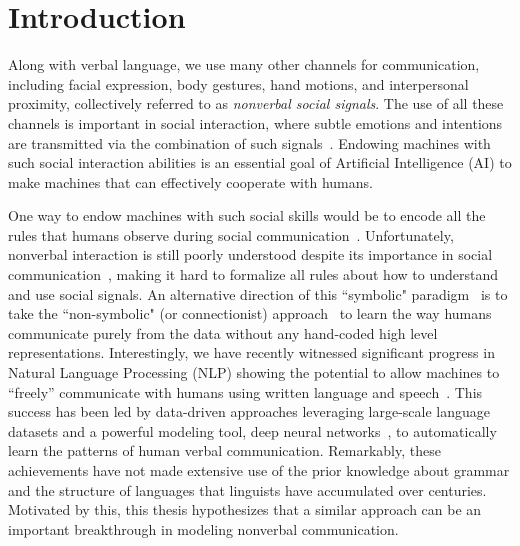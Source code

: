 
%
%	

\chapter{Introduction}
Along with verbal language, we use many other channels for communication, including facial expression, body gestures, hand motions, and interpersonal proximity, collectively referred to as \emph{nonverbal social signals}. The use of all these channels is important in social interaction, where subtle emotions and intentions are transmitted via the combination of such signals~\cite{Moore13}. Endowing machines with such social interaction abilities is an essential goal of Artificial Intelligence (AI) to make machines that can effectively cooperate with humans.%

One way to endow machines with such social skills would be to encode all the rules that humans observe during social communication~\cite{cassell1994animated, cassell2000embodied}. Unfortunately, nonverbal interaction is still poorly understood despite its importance in social communication~\cite{Mehrabian67,Mehrabian81,Birdwhistell-1970}, making it hard to formalize all rules about how to understand and use social signals. An alternative direction of this ``symbolic" paradigm~\cite{newell1976} is to take the ``non-symbolic" (or connectionist) approach~\cite{rumelhart1986parallel} to learn the way humans communicate purely from the data without any hand-coded high level representations. Interestingly, we have recently witnessed significant progress in Natural Language Processing (NLP) showing the potential to allow machines to ``freely'' communicate with humans using written language and speech~\cite{young2018recent}. This success has been led by data-driven approaches leveraging large-scale language datasets and a powerful modeling tool, deep neural networks~\cite{lecun2015deep}, to automatically learn the patterns of human verbal communication. Remarkably, these achievements have not made extensive use of the prior knowledge about grammar and the structure of languages that linguists have accumulated over centuries. Motivated by this, this thesis hypothesizes that a similar approach can be an important breakthrough in modeling nonverbal communication. 

